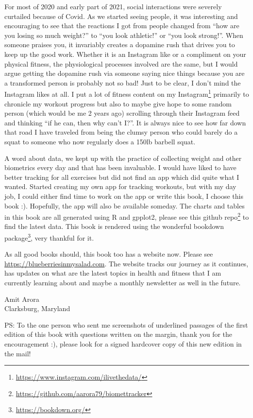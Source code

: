 \documentclass[
  oneside]{book}
\DeclareRobustCommand{\href}[2]{#2\footnote{\url{#1}}}
\begin{document}
For most of 2020 and early part of 2021, social interactions were severely curtailed because of Covid. As we started seeing people, it was interesting and encouraging to see that the reactions I got from people changed from ``how are you losing so much weight?'' to ``you look athletic!'' or ``you look strong!''. When someone praises you, it invariably creates a dopamine rush that drives you to keep up the good work. Whether it is an Instagram like or a compliment on your physical fitness, the physiological processes involved are the same, but I would argue getting the dopamine rush via someone saying nice things because you are a transformed person is probably not so bad! Just to be clear, I don't mind the Instagram likes at all. I put a lot of fitness content on my \href{https://www.instagram.com/ilivethedata/}{Instagram} primarily to chronicle my workout progress but also to maybe give hope to some random person (which would be me 2 years ago) scrolling through their Instagram feed and thinking ``if he can, then why can't I?''. It is always nice to see how far down that road I have traveled from being the clumsy person who could barely do a squat to someone who now regularly does a 150lb barbell squat.

A word about data, we kept up with the practice of collecting weight and other biometrics every day and that has been invaluable. I would have liked to have better tracking for all exercises but did not find an app which did quite what I wanted. Started creating my own app for tracking workouts, but with my day job, I could either find time to work on the app or write this book, I choose this book :). Hopefully, the app will also be available someday. The charts and tables in this book are all generated using R and gpplot2, please see this \href{https://github.com/aarora79/biomettracker}{github repo} to find the latest data. This book is rendered using the wonderful \href{https://bookdown.org/}{bookdown package}, very thankful for it.

As all good books should, this book too has a website now. Please see \url{https://blueberriesinmysalad.com}. The website tracks our journey as it continues, has updates on what are the latest topics in health and fitness that I am currently learning about and maybe a monthly newsletter as well in the future.

Amit Arora\\
Clarksburg, Maryland

PS: To the one person who sent me screenshots of underlined passages of the first edition of this book with questions written on the margin, thank you for the encouragement :), please look for a signed hardcover copy of this new edition in the mail!
\end{document}
